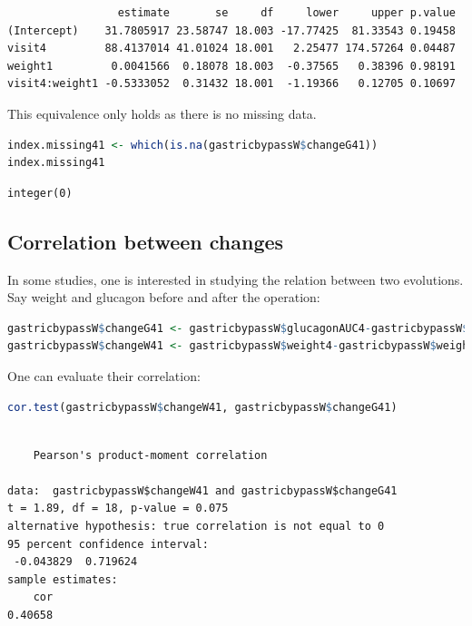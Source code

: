 \documentclass[12pt]{article}
\begin{document}
\label{}
\begin{verbatim}
                 estimate       se     df     lower     upper p.value
(Intercept)    31.7805917 23.58747 18.003 -17.77425  81.33543 0.19458
visit4         88.4137014 41.01024 18.001   2.25477 174.57264 0.04487
weight1         0.0041566  0.18078 18.003  -0.37565   0.38396 0.98191
visit4:weight1 -0.5333052  0.31432 18.001  -1.19366   0.12705 0.10697
\end{verbatim}


This equivalence only holds as there is no missing data.
\begin{lstlisting}[language=r,numbers=none]
index.missing41 <- which(is.na(gastricbypassW$changeG41))
index.missing41
\end{lstlisting}

\label{}
\begin{verbatim}
integer(0)
\end{verbatim}


\clearpage
\subsection{Correlation between changes}
\label{sec:orgf390b29}

In some studies, one is interested in studying the relation between
two evolutions. Say weight and glucagon before and after the
operation:
\begin{lstlisting}[language=r,numbers=none]
gastricbypassW$changeG41 <- gastricbypassW$glucagonAUC4-gastricbypassW$glucagonAUC1
gastricbypassW$changeW41 <- gastricbypassW$weight4-gastricbypassW$weight1
\end{lstlisting}

\bigskip

One can evaluate their correlation:
\begin{lstlisting}[language=r,numbers=none]
cor.test(gastricbypassW$changeW41, gastricbypassW$changeG41)
\end{lstlisting}

\label{}
\begin{verbatim}

	Pearson's product-moment correlation

data:  gastricbypassW$changeW41 and gastricbypassW$changeG41
t = 1.89, df = 18, p-value = 0.075
alternative hypothesis: true correlation is not equal to 0
95 percent confidence interval:
 -0.043829  0.719624
sample estimates:
    cor 
0.40658
\end{verbatim}
\end{document}
